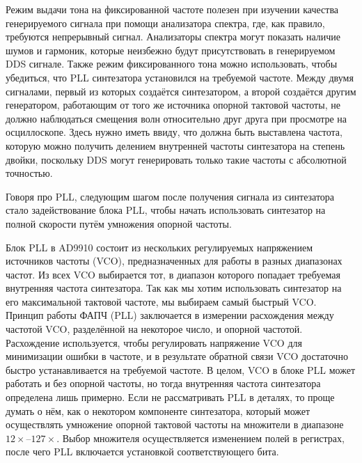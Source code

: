 \documentclass[rusmathsym, eqnumwithinsec, amspack, hyperref]{bomgost}
\begin{document}
Режим выдачи тона на фиксированной частоте полезен при изучении качества генерируемого сигнала при помощи анализатора спектра, где, как правило, требуются непрерывный сигнал. Анализаторы спектра могут показать наличие шумов и гармоник, которые неизбежно будут присутствовать в генерируемом DDS сигнале. Также режим фиксированного тона можно использовать, чтобы убедиться, что PLL синтезатора установился на требуемой частоте. Между двумя сигналами, первый из которых создаётся синтезатором, а второй создаётся другим генератором, работающим от того же источника опорной тактовой частоты, не должно наблюдаться смещения волн относительно друг друга при просмотре на осциллоскопе. Здесь нужно иметь ввиду, что должна быть выставлена частота, которую можно получить делением внутренней частоты синтезатора на степень двойки, поскольку DDS могут генерировать только такие частоты с абсолютной точностью.

Говоря про PLL, следующим шагом после получения сигнала из синтезатора стало задействование блока PLL, чтобы начать использовать синтезатор на полной скорости путём умножения опорной частоты.

Блок PLL в AD9910 состоит из нескольких регулируемых напряжением источников частоты (VCO), предназначенных для работы в разных диапазонах частот. Из всех VCO выбирается тот, в диапазон которого попадает требуемая внутренняя частота синтезатора. Так как мы хотим использовать синтезатор на его максимальной тактовой частоте, мы выбираем самый быстрый VCO. Принцип работы ФАПЧ (PLL) заключается в измерении расхождения между частотой VCO, разделённой на некоторое число, и опорной частотой. Расхождение используется, чтобы регулировать напряжение VCO для минимизации ошибки в частоте, и в результате обратной связи VCO достаточно быстро устанавливается на требуемой частоте. В целом, VCO в блоке PLL может работать и без опорной частоты, но тогда внутренняя частота синтезатора определена лишь примерно. Если не рассматривать PLL в деталях, то проще думать о нём, как о некотором компоненте синтезатора, который может осуществлять умножение опорной тактовой частоты на множители в диапазоне $12\times$--$127\times$. Выбор множителя осуществляется изменением полей в регистрах, после чего PLL включается установкой соответствующего бита.
\end{document}
